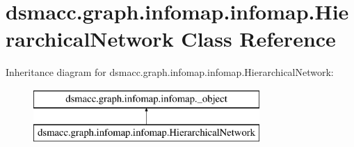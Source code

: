 \hypertarget{classdsmacc_1_1graph_1_1infomap_1_1infomap_1_1HierarchicalNetwork}{}\section{dsmacc.\+graph.\+infomap.\+infomap.\+Hierarchical\+Network Class Reference}
\label{classdsmacc_1_1graph_1_1infomap_1_1infomap_1_1HierarchicalNetwork}
Inheritance diagram for dsmacc.\+graph.\+infomap.\+infomap.\+Hierarchical\+Network\+:\begin{figure}[H]
\begin{center}
\leavevmode
\includegraphics[height=2.000000cm]{classdsmacc_1_1graph_1_1infomap_1_1infomap_1_1HierarchicalNetwork}
\end{center}
\end{figure}
